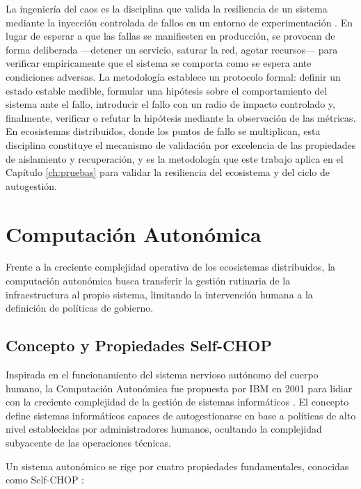 La ingenier\'{i}a del caos es la disciplina que valida la resiliencia de un sistema mediante la inyecci\'{o}n controlada de fallos en un entorno de experimentaci\'{o}n \cite{basiri2016chaos}. En lugar de esperar a que las fallas se manifiesten en producci\'{o}n, se provocan de forma deliberada ---detener un servicio, saturar la red, agotar recursos--- para verificar emp\'{i}ricamente que el sistema se comporta como se espera ante condiciones adversas. La metodolog\'{i}a establece un protocolo formal: definir un estado estable medible, formular una hip\'{o}tesis sobre el comportamiento del sistema ante el fallo, introducir el fallo con un radio de impacto controlado y, finalmente, verificar o refutar la hip\'{o}tesis mediante la observaci\'{o}n de las m\'{e}tricas. En ecosistemas distribuidos, donde los puntos de fallo se multiplican, esta disciplina constituye el mecanismo de validaci\'{o}n por excelencia de las propiedades de aislamiento y recuperaci\'{o}n, y es la metodolog\'{i}a que este trabajo aplica en el Cap\'{i}tulo \ref{ch:pruebas} para validar la resiliencia del ecosistema y del ciclo de autogesti\'{o}n.

\section{Computaci\'{o}n Auton\'{o}mica}
\label{sec:computacion-autonomica}

Frente a la creciente complejidad operativa de los ecosistemas distribuidos, la
computaci\'{o}n auton\'{o}mica busca transferir la gesti\'{o}n rutinaria de la
infraestructura al propio sistema, limitando la intervenci\'{o}n humana a la
definici\'{o}n de pol\'{i}ticas de gobierno.

\subsection{Concepto y Propiedades Self-CHOP}

Inspirada en el funcionamiento del sistema nervioso aut\'{o}nomo del cuerpo humano, la Computaci\'{o}n Auton\'{o}mica fue propuesta por IBM en 2001 para lidiar con la creciente complejidad de la gesti\'{o}n de sistemas inform\'{a}ticos \cite{kephart2003vision}. El concepto define sistemas inform\'{a}ticos capaces de autogestionarse en base a pol\'{i}ticas de alto nivel establecidas por administradores humanos, ocultando la complejidad subyacente de las operaciones t\'{e}cnicas.

Un sistema auton\'{o}mico se rige por cuatro propiedades fundamentales, conocidas como Self-CHOP \cite{mendonca2012architecture}:

